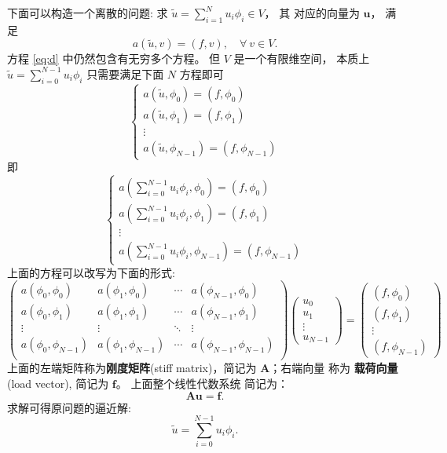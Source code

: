 \documentclass{article}
\begin{document}
下面可以构造一个离散的问题: 求 $ \tilde u = \sum_{i=1}^{N}u_i \phi_i \in V$， 其
对应的向量为 $\mathbf u$， 满足
\begin{equation}
    \label{eq:d}
    a(\tilde u, v) = (f, v),
    \quad\forall~v\in V.
\end{equation}
方程 \eqref{eq:d} 中仍然包含有无穷多个方程。 但 $V$ 是一个有限维空间， 本质上
$\tilde u= \sum_{i=0}^{N-1}u_i \phi_i$ 只需要满足下面 $N$ 方程即可
$$
\begin{cases}
    a(\tilde u, \phi_0) = (f, \phi_0) \\
    a(\tilde u, \phi_1) = (f, \phi_1) \\
    \vdots \\
    a(\tilde u, \phi_{N-1}) = (f, \phi_{N-1})
\end{cases}
$$
即
$$
\begin{cases}
    a(\sum_{i=0}^{N-1}u_i \phi_i, \phi_0) = (f, \phi_0) \\
    a(\sum_{i=0}^{N-1}u_i \phi_i, \phi_1) = (f, \phi_1) \\
    \vdots \\
    a(\sum_{i=0}^{N-1}u_i \phi_i, \phi_{N-1}) = (f, \phi_{N-1})
\end{cases}
$$
上面的方程可以改写为下面的形式:
$$
\begin{pmatrix}
    a(\phi_0, \phi_0) & a(\phi_1, \phi_0) & \cdots & a(\phi_{N-1}, \phi_0) \\
    a(\phi_0, \phi_1) & a(\phi_1, \phi_1) & \cdots & a(\phi_{N-1}, \phi_1) \\
    \vdots & \vdots & \ddots & \vdots \\
    a(\phi_0, \phi_{N-1}) & a(\phi_1, \phi_{N-1}) & \cdots & a(\phi_{N-1},
    \phi_{N-1}) \\
\end{pmatrix}
\begin{pmatrix}
    u_0 \\ u_1 \\ \vdots \\ u_{N-1}
\end{pmatrix}
=
\begin{pmatrix}
    (f, \phi_0) \\ (f, \phi_1) \\ \vdots \\ (f, \phi_{N-1})
\end{pmatrix}
$$
上面的左端矩阵称为{\bf 刚度矩阵}(stiff matrix)，简记为 $\mathbf A$；右端向量
称为 {\bf 载荷向量} (load vector), 简记为 $\mathbf f$。 上面整个线性代数系统
简记为：
$$
\mathbf A\mathbf u = \mathbf f.
$$
求解可得原问题的逼近解:
$$
\tilde u = \sum\limits_{i=0}^{N-1} u_i\phi_i.
$$
\end{document}
